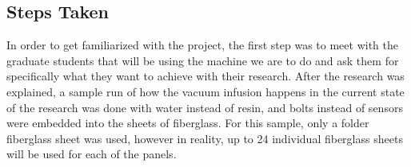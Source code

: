 \documentclass[12pt,letterpaper,notitlepage]{article}
\begin{document}
\subsection{Steps Taken}
In order to get familiarized with the project, the first step was to meet with the graduate students that will be using the machine we are to do and ask them for specifically what they want to achieve with their research. After the research was explained, a sample run of how the vacuum infusion happens in the current state of the research was done with water instead of resin, and bolts instead of sensors were embedded into the sheets of fiberglass. For this sample, only a folder fiberglass sheet was used, however in reality, up to 24 individual fiberglass sheets will be used for each of the panels.\\
\end{document}
